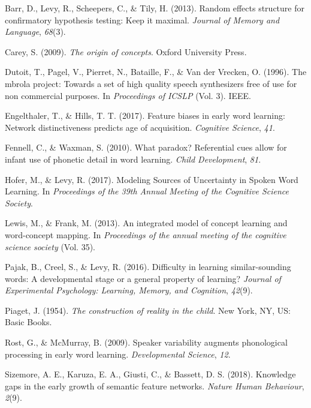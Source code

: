 \documentclass[10pt, letterpaper]{article}
\begin{document}
\hypertarget{refs}{}
\hypertarget{ref-barr2013}{}
Barr, D., Levy, R., Scheepers, C., \& Tily, H. (2013). Random effects
structure for confirmatory hypothesis testing: Keep it maximal.
\emph{Journal of Memory and Language}, \emph{68}(3).

\hypertarget{ref-carey2009}{}
Carey, S. (2009). \emph{The origin of concepts}. Oxford University
Press.

\hypertarget{ref-dutoit1996}{}
Dutoit, T., Pagel, V., Pierret, N., Bataille, F., \& Van der Vrecken, O.
(1996). The mbrola project: Towards a set of high quality speech
synthesizers free of use for non commercial purposes. In
\emph{Proceedings of ICSLP} (Vol. 3). IEEE.

\hypertarget{ref-engelthaler2017}{}
Engelthaler, T., \& Hills, T. T. (2017). Feature biases in early word
learning: Network distinctiveness predicts age of acquisition.
\emph{Cognitive Science}, \emph{41}.

\hypertarget{ref-fennell2010}{}
Fennell, C., \& Waxman, S. (2010). What paradox? Referential cues allow
for infant use of phonetic detail in word learning. \emph{Child
Development}, \emph{81}.

\hypertarget{ref-hofer2017}{}
Hofer, M., \& Levy, R. (2017). Modeling Sources of Uncertainty in Spoken
Word Learning. In \emph{Proceedings of the 39th Annual Meeting of the
Cognitive Science Society}.

\hypertarget{ref-lewis2013}{}
Lewis, M., \& Frank, M. (2013). An integrated model of concept learning
and word-concept mapping. In \emph{Proceedings of the annual meeting of
the cognitive science society} (Vol. 35).

\hypertarget{ref-pajak2016}{}
Pajak, B., Creel, S., \& Levy, R. (2016). Difficulty in learning
similar-sounding words: A developmental stage or a general property of
learning? \emph{Journal of Experimental Psychology: Learning, Memory,
and Cognition}, \emph{42}(9).

\hypertarget{ref-piaget1954}{}
Piaget, J. (1954). \emph{The construction of reality in the child}. New
York, NY, US: Basic Books.

\hypertarget{ref-rost2009}{}
Rost, G., \& McMurray, B. (2009). Speaker variability augments
phonological processing in early word learning. \emph{Developmental
Science}, \emph{12}.

\hypertarget{ref-sizemore2018}{}
Sizemore, A. E., Karuza, E. A., Giusti, C., \& Bassett, D. S. (2018).
Knowledge gaps in the early growth of semantic feature networks.
\emph{Nature Human Behaviour}, \emph{2}(9).
\end{document}
